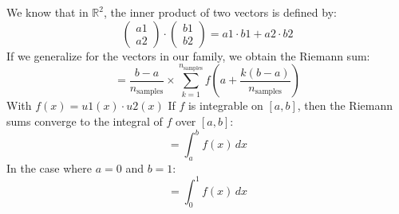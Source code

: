 We know that in \( \mathbb{R}^2 \), the inner product of two vectors is defined by:
\newline
\newline 
\[
\begin{pmatrix}
a1 
\\a2
\end{pmatrix}
\cdot
\begin{pmatrix}
b1 
\\b2
\end{pmatrix}
= a1 \cdot b1 + a2 \cdot b2
\]
\newline
\newline
If we generalize for the vectors in our family, we obtain the Riemann sum:
\newline
\newline
\[
= \frac{b-a}{n_{\text{samples}}} \times \sum_{k=1}^{n_{\text{samples}}} f\left(a+\frac{k(b-a)}{n_{\text{samples}}}\right)
\]
With \( f(x) = u1(x) \cdot u2(x) \)
\newline
\newline
If \( f \) is integrable on \([a,b]\), then the Riemann sums converge to the integral of \( f \) over \([a,b]\):
\[
= \int_{a}^{b} f(x) \, dx
\]
In the case where \( a = 0 \) and \( b = 1 \):
\[
= \int_{0}^{1} f(x) \, dx
\]

